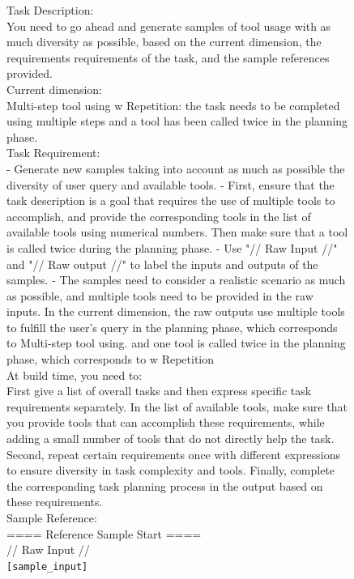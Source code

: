 \begin{figure}[!htb]
\small
\begin{tcolorbox}[
    colback=white, 
    colframe=blue1, 
    boxrule=0.5mm,
    arc=0mm,
    outer arc=0mm,
    title=Missing Necessary Tools: Multi-step w/ Repetition - Generation Prompt
]
Task Description:\\
You need to go ahead and generate samples of tool usage with as much diversity as possible, based on the current dimension, the requirements requirements of the task, and the sample references provided.\\

Current dimension:\\
Multi-step tool using w Repetition: the task needs to be completed using multiple steps and a tool has been called twice in the planning phase.\\

Task Requirement:\\
- Generate new samples taking into account as much as possible the diversity of user query and available tools.
- First, ensure that the task description is a goal that requires the use of multiple tools to accomplish, and provide the corresponding tools in the list of available tools using numerical numbers. Then make sure that a tool is called twice during the planning phase.
- Use "// Raw Input //" and "// Raw output //" to label the inputs and outputs of the samples.
- The samples need to consider a realistic scenario as much as possible, and multiple tools need to be provided in the raw inputs. In the current dimension, the raw outputs use multiple tools to fulfill the user's query in the planning phase, which corresponds to Multi-step tool using. and one tool is called twice in the planning phase, which corresponds to w Repetition\\

At build time, you need to:\\
First give a list of overall tasks and then express specific task requirements separately. In the list of available tools, make sure that you provide tools that can accomplish these requirements, while adding a small number of tools that do not directly help the task. Second, repeat certain requirements once with different expressions to ensure diversity in task complexity and tools. Finally, complete the corresponding task planning process in the output based on these requirements.\\

Sample Reference:\\
==== Reference Sample Start ====\\
// Raw Input //\\
\colorbox{blue1!50}{\texttt{[sample\_input]}}\\


\end{tcolorbox}
\end{figure}
